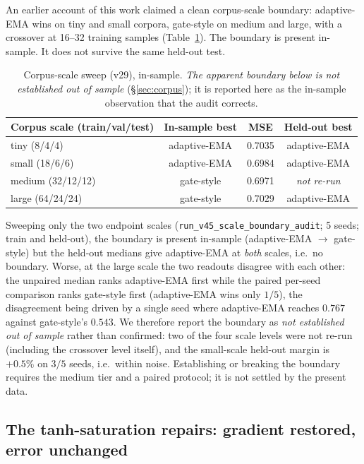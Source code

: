 \documentclass[10pt,twoside]{article}
\theoremstyle{definition}
\theoremstyle{plain}
\theoremstyle{remark}
\begin{document}
An earlier account of this work claimed a clean corpus-scale boundary: adaptive-EMA wins on tiny and small corpora, gate-style on medium and large, with a crossover at 16--32 training samples (Table~\ref{tab:scale}). The boundary is present in-sample. It does not survive the same held-out test.

\begin{table}[htbp]
\centering
\caption{Corpus-scale sweep (v29), in-sample. \emph{The apparent boundary below is not established out of sample} (\S\ref{sec:corpus}); it is reported here as the in-sample observation that the audit corrects.}
\label{tab:scale}
\small
\begin{tabular}{lccc}
\toprule
\textbf{Corpus scale (train/val/test)} & \textbf{In-sample best} & \textbf{MSE} & \textbf{Held-out best} \\
\midrule
tiny (8/4/4) & adaptive-EMA & 0.7035 & adaptive-EMA \\
small (18/6/6) & adaptive-EMA & 0.6984 & adaptive-EMA \\
medium (32/12/12) & gate-style & 0.6971 & \emph{not re-run} \\
large (64/24/24) & gate-style & 0.7029 & adaptive-EMA \\
\bottomrule
\end{tabular}
\end{table}

Sweeping only the two endpoint scales (\texttt{run\_v45\_scale\_boundary\_audit}; 5 seeds; train and held-out), the boundary is present in-sample (adaptive-EMA $\rightarrow$ gate-style) but the held-out medians give adaptive-EMA at \emph{both} scales, i.e.\ no boundary. Worse, at the large scale the two readouts disagree with each other: the unpaired median ranks adaptive-EMA first while the paired per-seed comparison ranks gate-style first (adaptive-EMA wins only $1/5$), the disagreement being driven by a single seed where adaptive-EMA reaches $0.767$ against gate-style's $0.543$. We therefore report the boundary as \emph{not established out of sample} rather than confirmed: two of the four scale levels were not re-run (including the crossover level itself), and the small-scale held-out margin is $+0.5\%$ on $3/5$ seeds, i.e.\ within noise. Establishing or breaking the boundary requires the medium tier and a paired protocol; it is not settled by the present data.

\subsection{The tanh-saturation repairs: gradient restored, error unchanged}
\label{sec:repair-exp}
\end{document}

